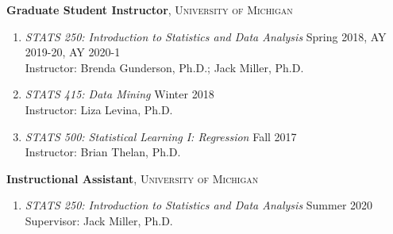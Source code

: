 \documentclass[letterpaper,11pt]{article} %
\begin{document}
		\noindent \textbf{Graduate Student Instructor}, \textsc{University of Michigan}
		\begin{enumerate}
			\item \textit{STATS 250: Introduction to Statistics and Data Analysis} \hfill Spring 2018, AY 2019-20, AY 2020-1 \\
			Instructor: Brenda Gunderson, Ph.D.; Jack Miller, Ph.D.
			
			\item \textit{STATS 415: Data Mining} \hfill Winter 2018 \\
			Instructor: Liza Levina, Ph.D. 
			
			\item \textit{STATS 500: Statistical Learning I: Regression} \hfill Fall 2017 \\
			Instructor: Brian Thelan, Ph.D.
			
		\end{enumerate}
	
	\noindent \textbf{Instructional Assistant}, \textsc{University of Michigan}
	\begin{enumerate}
		\item \textit{STATS 250: Introduction to Statistics and Data Analysis} \hfill Summer 2020 \\
		Supervisor: Jack Miller, Ph.D.
	\end{enumerate}
	
\end{document}
